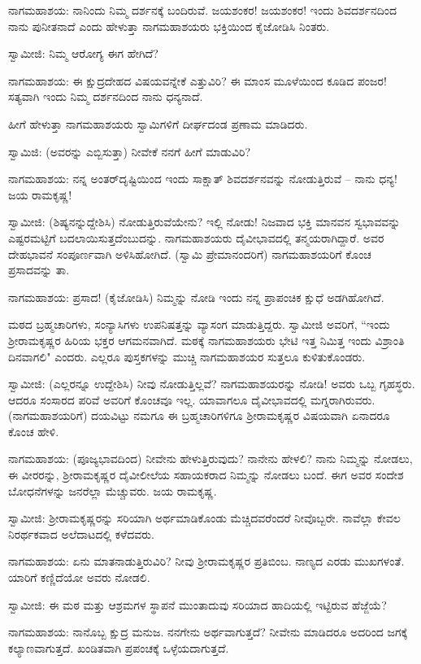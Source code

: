 ನಾಗಮಹಾಶಯ: ನಾನಿಂದು ನಿಮ್ಮ ದರ್ಶನಕ್ಕೆ ಬಂದಿರುವೆ. ಜಯಶಂಕರ! ಜಯಶಂಕರ! ಇಂದು ಶಿವದರ್ಶನದಿಂದ ನಾನು ಪುನೀತನಾದೆ ಎಂದು ಹೇಳುತ್ತಾ ನಾಗಮಹಾಶಯರು ಭಕ್ತಿಯಿಂದ ಕೈಜೋಡಿಸಿ ನಿಂತರು.

ಸ್ವಾಮೀಜಿ: ನಿಮ್ಮ ಆರೋಗ್ಯ ಈಗ ಹೇಗಿದೆ?

ನಾಗಮಹಾಶಯ: ಈ ಕ್ಷುದ್ರದೇಹದ ವಿಷಯವನ್ನೇಕೆ ಎತ್ತುವಿರಿ? ಈ ಮಾಂಸ ಮೂಳೆಯಿಂದ ಕೂಡಿದ ಪಂಜರ! ಸತ್ಯವಾಗಿ ಇಂದು ನಿಮ್ಮ ದರ್ಶನದಿಂದ ನಾನು ಧನ್ಯನಾದೆ.

ಹೀಗೆ ಹೇಳುತ್ತಾ ನಾಗಮಹಾಶಯರು ಸ್ವಾಮಿಗಳಿಗೆ ದೀರ್ಘದಂಡ ಪ್ರಣಾಮ ಮಾಡಿದರು.

ಸ್ವಾಮಿಜಿ: (ಅವರನ್ನು ಎಬ್ಬಿಸುತ್ತಾ) ನೀವೇಕೆ ನನಗೆ ಹೀಗೆ ಮಾಡುವಿರಿ?

ನಾಗಮಹಾಶಯ: ನನ್ನ ಅಂತರ್‌ದೃಷ್ಟಿಯಿಂದ ಇಂದು ಸಾಕ್ಷಾತ್ ಶಿವದರ್ಶನವನ್ನು ನೋಡುತ್ತಿರುವೆ – ನಾನು ಧನ್ಯ! ಜಯ ರಾಮಕೃಷ್ಣ!

ಸ್ವಾಮೀಜಿ: (ಶಿಷ್ಯನನ್ನುದ್ದೇಶಿಸಿ) ನೋಡುತ್ತಿರುವೆಯೇನು? ಇಲ್ಲಿ ನೋಡು! ನಿಜವಾದ ಭಕ್ತಿ ಮಾನವನ ಸ್ವಭಾವವನ್ನು ಎಷ್ಟರಮಟ್ಟಿಗೆ ಬದಲಾಯಿಸುತ್ತದೆಂಬುದನ್ನು. ನಾಗಮಹಾಶಯರು ದೈವೀಭಾವದಲ್ಲಿ ತನ್ಮಯರಾಗಿದ್ದಾರೆ. ಅವರ ದೇಹಭಾವನೆ ಸಂಪೂರ್ಣವಾಗಿ ಅಳಿಸಿಹೋಗಿದೆ. (ಸ್ವಾಮಿ ಪ್ರೇಮಾನಂದರಿಗೆ) ನಾಗಮಹಾಶಯರಿಗೆ ಕೊಂಚ ಪ್ರಸಾದವನ್ನು ತಾ.

ನಾಗಮಹಾಶಯ: ಪ್ರಸಾದ! (ಕೈಜೋಡಿಸಿ) ನಿಮ್ಮನ್ನು ನೋಡಿ ಇಂದು ನನ್ನ ಪ್ರಾಪಂಚಿಕ ಕ್ಷುಧೆ ಅಡಗಿಹೋಗಿದೆ.

ಮಠದ ಬ್ರಹ್ಮಚಾರಿಗಳು, ಸಂನ್ಯಾಸಿಗಳು ಉಪನಿಷತ್ತನ್ನು ವ್ಯಾಸಂಗ ಮಾಡುತ್ತಿದ್ದರು. ಸ್ವಾಮೀಜಿ ಅವರಿಗೆ, “ಇಂದು ಶ‍್ರೀರಾಮಕೃಷ್ಣರ ಹಿರಿಯ ಭಕ್ತರ ಆಗಮನವಾಗಿದೆ. ಮಠಕ್ಕೆ ನಾಗಮಹಾಶಯರು ಭೇಟಿ ಇತ್ತ ನಿಮಿತ್ತ ಇಂದು ವಿಶ್ರಾಂತಿ ದಿನವಾಗಲಿ" ಎಂದರು. ಎಲ್ಲರೂ ಪುಸ್ತಕಗಳನ್ನು ಮುಚ್ಚಿ ನಾಗಮಹಾಶಯರ ಸುತ್ತಲೂ ಕುಳಿತುಕೊಂಡರು.

ಸ್ವಾಮೀಜಿ: (ಎಲ್ಲರನ್ನೂ ಉದ್ದೇಶಿಸಿ) ನೀವು ನೋಡುತ್ತಿಲ್ಲವೆ? ನಾಗಮಹಾಶಯರನ್ನು ನೋಡಿ! ಅವರು ಒಬ್ಬ ಗೃಹಸ್ಥರು. ಆದರೂ ಸಂಸಾರದ ಪರಿವೆ ಅವರಿಗೆ ಕೊಂಚವೂ ಇಲ್ಲ. ಯಾವಾಗಲೂ ದೈವೀಭಾವದಲ್ಲಿ ಮಗ್ನರಾಗಿರುವರು. (ನಾಗಮಹಾಶಯರಿಗೆ) ದಯವಿಟ್ಟು ನಮಗೂ ಈ ಬ್ರಹ್ಮಚಾರಿಗಳಿಗೂ ಶ‍್ರೀರಾಮಕೃಷ್ಣರ ವಿಷಯವಾಗಿ ಏನಾದರೂ ಕೊಂಚ ಹೇಳಿ.

ನಾಗಮಹಾಶಯ: (ಪೂಜ್ಯಭಾವದಿಂದ) ನೀವೇನು ಹೇಳುತ್ತಿರುವುದು? ನಾನೇನು ಹೇಳಲಿ? ನಾನು ನಿಮ್ಮನ್ನು ನೋಡಲು, ಈ ವೀರರನ್ನು, ಶ‍್ರೀರಾಮಕೃಷ್ಣರ ದೈವೀಲೀಲೆಯ ಸಹಾಯಕರಾದ ನಿಮ್ಮನ್ನು ನೋಡಲು ಬಂದೆ. ಈಗ ಅವರ ಸಂದೇಶ ಬೋಧನೆಗಳನ್ನು ಜನರೆಲ್ಲಾ ಮೆಚ್ಚುವರು. ಜಯ ರಾಮಕೃಷ್ಣ.

ಸ್ವಾಮೀಜಿ: ಶ‍್ರೀರಾಮಕೃಷ್ಣರನ್ನು ಸರಿಯಾಗಿ ಅರ್ಥಮಾಡಿಕೊಂಡು ಮೆಚ್ಚಿದವರೆಂದರೆ ನೀವೊಬ್ಬರೇ. ನಾವೆಲ್ಲಾ ಕೇವಲ ನಿರರ್ಥಕವಾದ ಅಲೆದಾಟದಲ್ಲಿ ಕಳೆದವರು.

ನಾಗಮಹಾಶಯ: ಏನು ಮಾತನಾಡುತ್ತಿರುವಿರಿ? ನೀವು ಶ‍್ರೀರಾಮಕೃಷ್ಣರ ಪ್ರತಿಬಿಂಬ. ನಾಣ್ಯದ ಎರಡು ಮುಖಗಳಂತೆ. ಯಾರಿಗೆ ಕಣ್ಣಿದೆಯೋ ಅವರು ನೋಡಲಿ.

ಸ್ವಾಮೀಜಿ: ಈ ಮಠ ಮತ್ತು ಆಶ್ರಮಗಳ ಸ್ಥಾಪನೆ ಮುಂತಾದುವು ಸರಿಯಾದ ಹಾದಿಯಲ್ಲಿ ಇಟ್ಟಿರುವ ಹೆಜ್ಜೆಯೆ?

ನಾಗಮಹಾಶಯ: ನಾನೊಬ್ಬ ಕ್ಷುದ್ರ ಮನುಜ. ನನಗೇನು ಅರ್ಥವಾಗುತ್ತದೆ? ನೀವೇನು ಮಾಡಿದರೂ ಅದರಿಂದ ಜಗಕ್ಕೆ ಕಲ್ಯಾಣವಾಗುತ್ತದೆ. ಖಂಡಿತವಾಗಿ ಪ್ರಪಂಚಕ್ಕೆ ಒಳ್ಳೆಯದಾಗುತ್ತದೆ.


